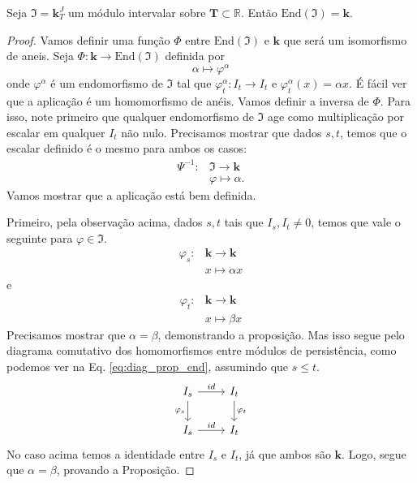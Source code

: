 \begin{propo}
    Seja $\mathfrak{I} = \mathbf{k}^J_T$ um módulo intervalar sobre $\mathbf{T} \subset \mathbb{R}$. 
    Então $\text{End}(\mathfrak{I}) = \mathbf{k}$. 
\end{propo}
\begin{proof}
    Vamos definir uma função $\Phi$ entre $\text{End}(\mathfrak{I})$ e $\mathbf{k}$ que será um isomorfismo
    de aneis.
    Seja $\Phi \colon \mathbf{k} \to \text{End}(\mathfrak{I})$ definida por 
    \begin{equation*}
        \alpha \mapsto \varphi^{\alpha}
    \end{equation*}
    onde $\varphi^\alpha$ é um endomorfismo de $\mathfrak{I}$ tal que $\varphi_t^{\alpha} \colon I_t 
    \to I_t$ e $\varphi^{\alpha}_t (x) = \alpha x$. É fácil ver que a aplicação é um homomorfismo de anéis.
    Vamos definir a inversa de $\Phi$. Para isso, note primeiro que qualquer endomorfismo de $\mathfrak{I}$
    age como multiplicação por escalar em qualquer $I_t$ não nulo. Precisamos mostrar que dados $s,t$, temos 
    que o escalar definido é o mesmo para ambos os casos:
    \begin{align*}
        \Psi^{-1} \colon & \mathfrak{I} \to \mathbf{k} \\
                         & \varphi \mapsto \alpha.
    \end{align*}
    Vamos mostrar que a aplicação está bem definida.
    
    Primeiro, pela observação acima, dados $s,t$ tais que $I_s, I_t \neq 0$, temos que vale o seguinte
    para $\varphi \in \mathfrak{I}$.
    \begin{align*}
        \varphi_s \colon & \mathbf{k} \to \mathbf{k} \\
                         &     x \mapsto \alpha x 
    \end{align*}
    e 
    \begin{align*}
        \varphi_t \colon & \mathbf{k} \to \mathbf{k} \\
                         &     x \mapsto \beta x 
    \end{align*}
    Precisamos mostrar que $\alpha = \beta$, demonstrando a proposição. Mas isso segue pelo 
    diagrama comutativo dos homomorfismos entre módulos de persistência, como podemos ver na 
    Eq. \eqref{eq:diag_prop_end}, assumindo que $s \leq t$. 
    \begin{equation}
        \label{eq:diag_prop_end}
        \begin{tikzcd}
            I_s \arrow{d}[swap]{\varphi_s} \arrow{r}{id} & I_t \arrow{d}{\varphi_t} \\
            I_s \arrow{r}{id}                     & I_t                    
        \end{tikzcd} 
    \end{equation}
    No caso acima temos a identidade entre $I_s$ e $I_t$, já que ambos são $\mathbf{k}$. Logo,
    segue que $\alpha=\beta$, provando a Proposição.
\end{proof}

